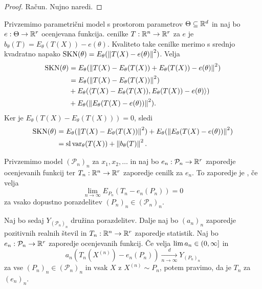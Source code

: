 \begin{proof}
  Račun.
  Nujno naredi.
\end{proof}


Privzemimo parametrični model s prostorom parametrov $\Theta \subseteq \mathbb{R}^d$ in
naj bo $e: \Theta \to \mathbb{R}^r$ ocenjevana funkcija.
 cenilke $T: \mathbb{R}^n \to \mathbb{R}^r$ za $e$ je $b_\theta(T) =
E_\theta(T(X)) - e(\theta)$.
Kvaliteto take cenilke merimo s srednjo kvadratno napako
$\operatorname{SKN}(\theta) = E_\theta(\left\lVert T(X) - e(\theta)\right\rVert^2)$.
Velja
\begin{align*}
  \operatorname{SKN}(\theta)
  &= E_\theta(\left\lVert T(X) - E_\theta(T(X)) + E_\theta(T(X)) - e(\theta)\right\rVert^2) \\
  &= E_\theta(\left\lVert T(X) - E_\theta(T(X))\right\rVert^2) \\
  &+ E_\theta(\left< T(X) - E_\theta(T(X)), E_\theta(T(X)) - e(\theta) \right>) \\
  &+ E_\theta(\left\lVert E_\theta(T(X) - e(\theta))\right\rVert^2).
\end{align*}
Ker je $E_\theta(T(X) - E_\theta(T(X))) = 0$, sledi
\begin{align*}
  \operatorname{SKN}(\theta)
  &= E_\theta(\left\lVert T(X) - E_\theta(T(X))\right\rVert^2)
  + E_\theta(\left\lVert E_\theta(T(X) - e(\theta))\right\rVert^2) \\
  &= \operatorname{sl} \operatorname{var}_\theta(T(X)) + \left\lVert b_\theta(T)\right\rVert^2.
\end{align*}

\begin{definicija}
  \label{stat2:def:nepristransko-v-limiti}
  Privzemimo model $(\mathcal{P}_n)_n$ za $x_1, x_2, \ldots$ in naj bo $e_n:
  \mathcal{P}_n \to \mathbb{R}^r$ zaporedje ocenjevanih funkcij ter $T_n: \mathbb{R}^n \to \mathbb{R}^r$
  zaporedje cenilk za $e_n$. To zaporedje je , če velja
  \[
	\lim_{n \to \infty} E_{P_n}(T_n - e_n(P_n)) = 0
  \]
  za vsako dopustno porazdelitev $(P_n)_n \in (\mathcal{P}_n)_n$.
\end{definicija}

\begin{definicija}
  Naj bo sedaj $Y_{(\mathcal{P}_n)_n}$ družina porazdelitev. Dalje naj bo
  $(a_n)_n$ zaporedje pozitivnih realnih števil in $T_n: \mathbb{R}^n \to \mathbb{R}^r$
  zaporedje statistik. Naj bo $e_n: \mathcal{P}_n \to \mathbb{R}^r$ zaporedje
  ocenjevanih funkcij. Če velja $\lim a_n \in \left(0, \infty\right]$ in
  \[
	a_n (T_n(X^{(n)}) - e_n(P_n)) \xrightarrow[n \to \infty]{d} Y_{(P_n)_n}
  \]
  za vse $(P_n)_n \in (\mathcal{P}_n)_n$ in vsak $X$ z $X^{(n)} \sim P_n$, potem
  pravimo, da je $T_n$  za
  $(e_n)_n$.
\end{definicija}

